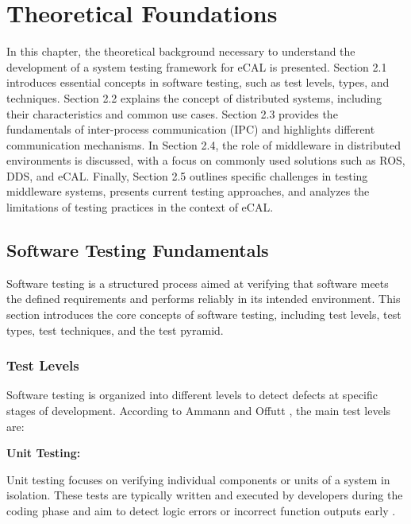 \clearpage
\section{Theoretical Foundations}

In this chapter, the theoretical background necessary to understand the development of a system testing framework for eCAL is presented. Section 2.1 introduces essential concepts in software testing, such as test levels, types, and techniques. Section 2.2 explains the concept of distributed systems, including their characteristics and common use cases. Section 2.3 provides the fundamentals of inter-process communication (IPC) and highlights different communication mechanisms. In Section 2.4, the role of middleware in distributed environments is discussed, with a focus on commonly used solutions such as ROS, DDS, and eCAL. Finally, Section 2.5 outlines specific challenges in testing middleware systems, presents current testing approaches, and analyzes the limitations of testing practices in the context of eCAL.

\subsection{Software Testing Fundamentals}

Software testing is a structured process aimed at verifying that software meets the defined requirements and performs reliably in its intended environment. This section introduces the core concepts of software testing, including test levels, test types, test techniques, and the test pyramid.

\subsubsection{Test Levels}

Software testing is organized into different levels to detect defects at specific stages of development. According to Ammann and Offutt \cite{ammann2016introduction}, the main test levels are:

\vspace{1em}
\textbf{Unit Testing:}

\vspace{0.4em}
Unit testing focuses on verifying individual components or units of a system in isolation. These tests are typically written and executed by developers during the coding phase and aim to detect logic errors or incorrect function outputs early \cite{pressman2014software}.

